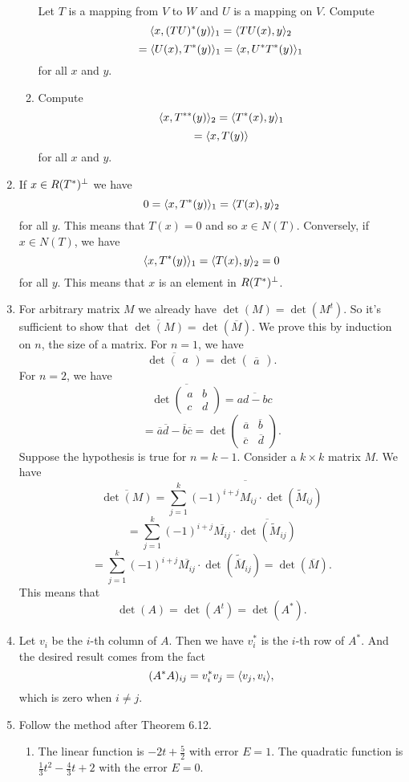 \begin{enumerate}
\begin{enumerate}
Let $T$ is a mapping from $V$ to $W$ and $U$ is a mapping on $V$. Compute 
\[\langle x,(TU)^*(y)\rangle_1 =\langle TU(x),y\rangle_2 \]
\[=\langle U(x),T^*(y)\rangle_1 =\langle x,U^*T^*(y)\rangle_1 \]
for all $x$ and $y$.
\item Compute 
\[\langle x,T^{**}(y)\rangle_2 =\langle T^*(x),y\rangle_1 \]
\[=\langle x,T(y)\rangle \]
for all $x$ and $y$.
\end{enumerate}
\item If $x\in R(T^*)^{\perp}$ we have 
\[0=\langle x,T^*(y)\rangle_1 =\langle T(x),y\rangle_2 \]
for all $y$. This means that $T(x)=0$ and so $x\in N(T)$. Conversely, if $x\in N(T)$, we have 
\[\langle x,T^*(y)\rangle_1 =\langle T(x),y\rangle_2 =0\]
for all $y$. This means that $x$ is an element in $R(T^*)^{\perp}$.
\item For arbitrary matrix $M$ we already have $\det(M)=\det(M^t)$. So it's sufficient to show that $\overline{\det(M)}=\det(\overline{M})$. We prove this by induction on $n$, the size of a matrix. For $n=1$, we have 
\[\overline{\det\begin{pmatrix}a\end{pmatrix}}=\det\begin{pmatrix}\overline{a}\end{pmatrix}.\]
For $n=2$, we have 
\[\overline{\det\begin{pmatrix}a&b\\c&d\end{pmatrix}}=\overline{ad-bc}\]
\[=\overline{a}\overline{d}-\overline{b}\overline{c}=\det\begin{pmatrix}\overline{a}&\overline{b}\\\overline{c}&\overline{d}\end{pmatrix}.\]
Suppose the hypothesis is true for $n=k-1$. Consider a $k\times k$ matrix $M$. We have 
\[\overline{\det(M)}=\overline{\sum_{j=1}^k{(-1)^{i+j}M_{ij}\cdot \det(\tilde{M}_{ij})}}\]
\[=\sum_{j=1}^k{(-1)^{i+j}\overline{M_{ij}}\cdot \overline{\det(\tilde{M}_{ij})}}\]
\[=\sum_{j=1}^k{(-1)^{i+j}\overline{M_{ij}}\cdot \det(\tilde{\overline{M}}_{ij})}=\det(\overline{M}).\]
This means that 
\[\det(A)=\det(A^t)=\det(A^*).\]
\item Let $v_i$ be the $i$-th column of $A$. Then we have $v_i^*$ is the $i$-th row of $A^*$. And the desired result comes from the fact
\[(A^*A)_{ij}=v_i^*v_j=\langle v_j,v_i\rangle , \]
which is zero when $i\neq j$.
\item Follow the method after Theorem 6.12.
\begin{enumerate}
\item The linear function is $-2t+\frac{5}{2}$ with error $E=1$. The quadratic function is $\frac{1}{3}t^2-\frac{4}{3}t+2$ with the error $E=0$.

\end{enumerate}
\end{enumerate}
